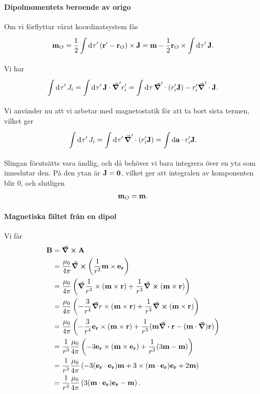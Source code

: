 \paragraph{Dipolmomentets beroende av origo}
Om vi förflyttar vårat koordinatsystem fås
\begin{align*}
	\vb{m}_{O} = \frac{1}{2}\int\limits_{}^{}\dd[]{\tau'}(\vb{r}' - \vb{r}_{O})\times\vb{J} = \vb{m} - \frac{1}{2}\vb{r}_{O}\times\int\limits_{}^{}\dd[]{\tau'}\vb{J}.
\end{align*}
Vi har
\begin{align*}
	\int\limits_{}^{}\dd[]{\tau'}J_{i} = \int\limits_{}^{}\dd[]{\tau'}\vb{J}\cdot\grad^{\prime}{r_{i}'} = \int\limits_{}^{}\dd[]{\tau}\grad^{\prime}\cdot{(}r_{i}'\vb{J}) - r_{i}'\grad^{\prime}\cdot{\vb{J}}.
\end{align*}
Vi använder nu att vi arbetar med magnetostatik för att ta bort sista termen, vilket ger
\begin{align*}
	\int\limits_{}^{}\dd[]{\tau'}J_{i} = \int\limits_{}^{}\dd[]{\tau'}\grad^{\prime}\cdot{(}r_{i}'\vb{J}) = \int\limits_{}^{}\dd{\vb{a}}\cdot r_{i}'\vb{J}.
\end{align*}
Slingan förutsätts vara ändlig, och då behöver vi bara integrera över en yta som inneslutar den. På den ytan är $\vb{J} = \vb{0}$, vilket ger att integralen av komponenten blir $0$, och slutligen
\begin{align*}
	\vb{m}_{O} = \vb{m}.
\end{align*}

\paragraph{Magnetiska fältet från en dipol}
Vi får
\begin{align*}
	\vb{B} &= \curl{\vb{A}} \\
	       &= \frac{\mu_{0}}{4\pi}\curl(\frac{1}{r^{2}}\vb{m}\times\vb{e}_{\vb{r}}) \\
	       &= \frac{\mu_{0}}{4\pi}\left(\grad{\frac{1}{r^{3}}}\times(\vb{m}\times\vb{r}) + \frac{1}{r^{3}}\curl(\vb{m}\times\vb{r})\right) \\
	       &= \frac{\mu_{0}}{4\pi}\left(-\frac{3}{r^{4}}\grad{r}\times(\vb{m}\times\vb{r}) + \frac{1}{r^{3}}\curl(\vb{m}\times\vb{r})\right) \\
	       &= \frac{\mu_{0}}{4\pi}\left(-\frac{3}{r^{4}}\vb{e}_{\vb{r}}\times(\vb{m}\times\vb{r}) + \frac{1}{r^{3}}(\vb{m}\div{\vb{r}}  - (\vb{m}\cdot\grad)\vb{r})\right) \\
	       &= \frac{1}{r^{3}}\frac{\mu_{0}}{4\pi}\left(-3\vb{e}_{\vb{r}}\times(\vb{m}\times\vb{e}_{\vb{r}}) + \frac{1}{r^{3}}(3\vb{m}  - \vb{m})\right) \\
	       &= \frac{1}{r^{3}}\frac{\mu_{0}}{4\pi}\left(-3(\vb{e}_{\vb{r}}\cdot\vb{e}_{\vb{r}})\vb{m} + 3\times(\vb{m}\cdot\vb{e}_{\vb{r}})\vb{e}_{\vb{r}} + 2\vb{m}\right) \\
	       &= \frac{1}{r^{3}}\frac{\mu_{0}}{4\pi}\left(3(\vb{m}\cdot\vb{e}_{\vb{r}})\vb{e}_{\vb{r}} - \vb{m}\right).
\end{align*}

